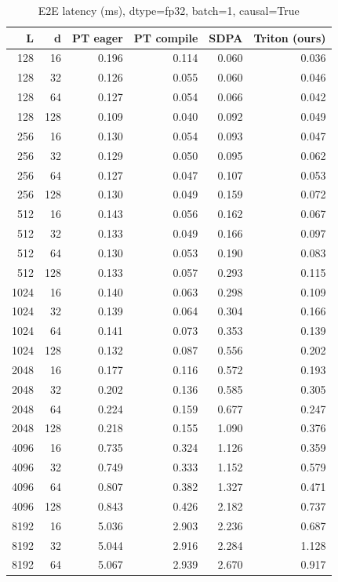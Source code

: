 \documentclass[11pt]{article}
\begin{document}
\begin{table}[H]\small\centering
\caption{E2E latency (ms), dtype=fp32, batch=1, causal=True}
\label{tab:fa2-fp32-e2e}
\begin{tabular}{rrrrrr}
\toprule
L & d & PT eager & PT compile & SDPA & Triton (ours) \\
\midrule
128 & 16 & 0.196 & 0.114 & 0.060 & 0.036 \\
128 & 32 & 0.126 & 0.055 & 0.060 & 0.046 \\
128 & 64 & 0.127 & 0.054 & 0.066 & 0.042 \\
128 & 128 & 0.109 & 0.040 & 0.092 & 0.049 \\
256 & 16 & 0.130 & 0.054 & 0.093 & 0.047 \\
256 & 32 & 0.129 & 0.050 & 0.095 & 0.062 \\
256 & 64 & 0.127 & 0.047 & 0.107 & 0.053 \\
256 & 128 & 0.130 & 0.049 & 0.159 & 0.072 \\
512 & 16 & 0.143 & 0.056 & 0.162 & 0.067 \\
512 & 32 & 0.133 & 0.049 & 0.166 & 0.097 \\
512 & 64 & 0.130 & 0.053 & 0.190 & 0.083 \\
512 & 128 & 0.133 & 0.057 & 0.293 & 0.115 \\
1024 & 16 & 0.140 & 0.063 & 0.298 & 0.109 \\
1024 & 32 & 0.139 & 0.064 & 0.304 & 0.166 \\
1024 & 64 & 0.141 & 0.073 & 0.353 & 0.139 \\
1024 & 128 & 0.132 & 0.087 & 0.556 & 0.202 \\
2048 & 16 & 0.177 & 0.116 & 0.572 & 0.193 \\
2048 & 32 & 0.202 & 0.136 & 0.585 & 0.305 \\
2048 & 64 & 0.224 & 0.159 & 0.677 & 0.247 \\
2048 & 128 & 0.218 & 0.155 & 1.090 & 0.376 \\
4096 & 16 & 0.735 & 0.324 & 1.126 & 0.359 \\
4096 & 32 & 0.749 & 0.333 & 1.152 & 0.579 \\
4096 & 64 & 0.807 & 0.382 & 1.327 & 0.471 \\
4096 & 128 & 0.843 & 0.426 & 2.182 & 0.737 \\
8192 & 16 & 5.036 & 2.903 & 2.236 & 0.687 \\
8192 & 32 & 5.044 & 2.916 & 2.284 & 1.128 \\
8192 & 64 & 5.067 & 2.939 & 2.670 & 0.917 \\

\end{tabular}
\end{table}
\end{document}
